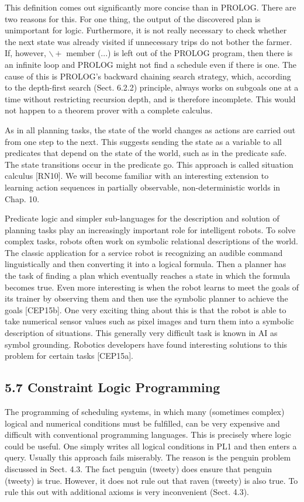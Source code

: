 \documentclass[10pt]{book}
\begin{document}
\begin{center}
This definition comes out significantly more concise than in PROLOG. There are two reasons for this. For one thing, the output of the discovered plan is unimportant for logic. Furthermore, it is not really necessary to check whether the next state was already visited if unnecessary trips do not bother the farmer. If, however, $\backslash+$ member (...) is left out of the PROLOG program, then there is an infinite loop and PROLOG might not find a schedule even if there is one. The cause of this is PROLOG's backward chaining search strategy, which, according to the depth-first search (Sect. 6.2.2) principle, always works on subgoals one at a time without restricting recursion depth, and is therefore incomplete. This would not happen to a theorem prover with a complete calculus.

As in all planning tasks, the state of the world changes as actions are carried out from one step to the next. This suggests sending the state as a variable to all predicates that depend on the state of the world, such as in the predicate safe. The state transitions occur in the predicate go. This approach is called situation calculus [RN10]. We will become familiar with an interesting extension to learning action sequences in partially observable, non-deterministic worlds in Chap. 10.

Predicate logic and simpler sub-languages for the description and solution of planning tasks play an increasingly important role for intelligent robots. To solve complex tasks, robots often work on symbolic relational descriptions of the world. The classic application for a service robot is recognizing an audible command linguistically and then converting it into a logical formula. Then a planner has the task of finding a plan which eventually reaches a state in which the formula becomes true. Even more interesting is when the robot learns to meet the goals of its trainer by observing them and then use the symbolic planner to achieve the goals [CEP15b]. One very exciting thing about this is that the robot is able to take numerical sensor values such as pixel images and turn them into a symbolic description of situations. This generally very difficult task is known in AI as symbol grounding. Robotics developers have found interesting solutions to this problem for certain tasks [CEP15a].

\subsection*{5.7 Constraint Logic Programming}
The programming of scheduling systems, in which many (sometimes complex) logical and numerical conditions must be fulfilled, can be very expensive and difficult with conventional programming languages. This is precisely where logic could be useful. One simply writes all logical conditions in PL1 and then enters a query. Usually this approach fails miserably. The reason is the penguin problem discussed in Sect. 4.3. The fact penguin (tweety) does ensure that penguin (tweety) is true. However, it does not rule out that raven (tweety) is also true. To rule this out with additional axioms is very inconvenient (Sect. 4.3).


\end{center}
\end{document}
